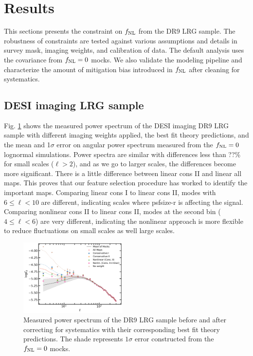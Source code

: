 \section{Results}\label{sec:results}
This sections presents the constraint on $f_{\rm NL}$ from the DR9 LRG sample. The robustness of constraints are tested against various assumptions and details in survey mask, imaging weights, and calibration of data. The default analysis uses the covariance from $f_{\rm NL}=0$ mocks. We also validate the modeling pipeline and characterize the amount of mitigation bias introduced in $f_{\rm NL}$ after cleaning for systematics. 

\subsection{DESI imaging LRG sample}

Fig. \ref{fig:cl_dr9} shows the measured power spectrum of the DESI imaging DR9 LRG sample with different imaging weights applied, the best fit theory predictions, and the mean and 1$\sigma$ error on angular power spectrum measured from the $f_{\rm NL}=0$ lognormal simulations. Power spectra are similar with differences less than ??\% for small scales ($\ell > 2$), and as we go to larger scales, the differences become more significant. There is a little difference between linear cons II and linear all maps. This proves that our feature selection procedure has worked to identify the important maps. Comparing linear cons I to linear cons II, modes with $6\leq \ell < 10$ are different, indicating scales where psfsize-r is affecting the signal. Comparing nonlinear cons II to linear cons II, modes at the second bin ($4 \leq \ell < 6$) are very different, indicating the nonlinear approach is more flexible to reduce fluctuations on small scales as well large scales. 

\begin{figure}
    \centering
    \includegraphics[width=0.48\textwidth]{figures/model_dr9.pdf} 
    \caption{Measured power spectrum of the DR9 LRG sample before and after correcting for systematics with their corresponding best fit theory predictions. The shade represents $1\sigma$ error constructed from the $f_{\rm NL}=0$ mocks.}
    \label{fig:cl_dr9}
\end{figure}

